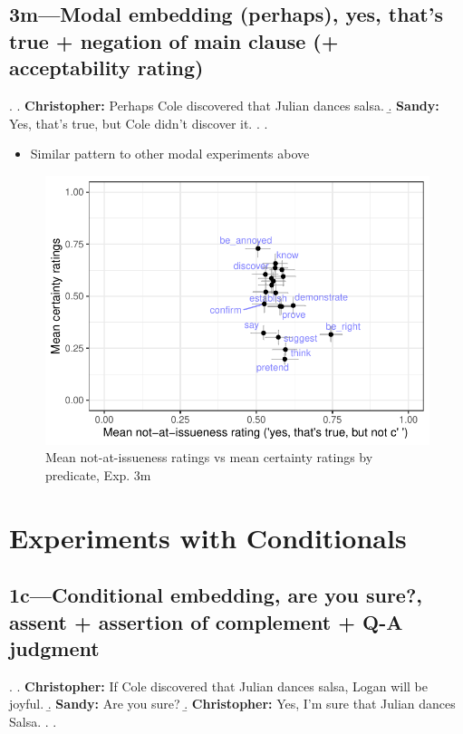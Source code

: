 \documentclass[11pt]{article}
\begin{document}

	\pagebreak
	\subsection{3m---Modal embedding (perhaps), yes, that's true + negation of main clause (+ acceptability rating)} %
		\ex. \a. \textbf{Christopher:} Perhaps Cole discovered that Julian dances salsa.
			\b. \textbf{Sandy:} Yes, that’s true, but Cole didn't discover it.
			\z.
		\z.

		\begin{itemize}
			\item Similar pattern to other modal experiments above
		\end{itemize}

		\begin{figure}[h]
			\centering
			\includegraphics[]{figures/m3-correl.pdf}
			\caption{Mean not-at-issueness ratings vs mean certainty ratings by predicate, Exp. 3m}
			\label{fig:m3-corr}
		\end{figure}
	
	
\pagebreak
\section{Experiments with Conditionals}

	\subsection{1c---Conditional embedding,  are you sure?, assent + assertion of complement + Q-A judgment}
		\ex. \a. \textbf{Christopher:} If Cole discovered that Julian dances salsa, Logan will be joyful.
			\b. \textbf{Sandy:} Are you sure?
			\b. \textbf{Christopher:} Yes, I'm sure that Julian dances Salsa.
			\z.
		\z.
\end{document}
